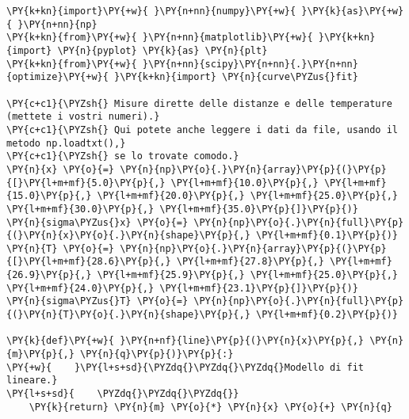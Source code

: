 \begin{Verbatim}[label=\makebox{\href{https://github.com/unipi-physics-labs/lab1-sheets/tree/main/snippy/conducibilita_termica.py}{https://github.com/.../conducibilita\_termica.py}},commandchars=\\\{\}]
\PY{k+kn}{import}\PY{+w}{ }\PY{n+nn}{numpy}\PY{+w}{ }\PY{k}{as}\PY{+w}{ }\PY{n+nn}{np}
\PY{k+kn}{from}\PY{+w}{ }\PY{n+nn}{matplotlib}\PY{+w}{ }\PY{k+kn}{import} \PY{n}{pyplot} \PY{k}{as} \PY{n}{plt}
\PY{k+kn}{from}\PY{+w}{ }\PY{n+nn}{scipy}\PY{n+nn}{.}\PY{n+nn}{optimize}\PY{+w}{ }\PY{k+kn}{import} \PY{n}{curve\PYZus{}fit}

\PY{c+c1}{\PYZsh{} Misure dirette delle distanze e delle temperature (mettete i vostri numeri).}
\PY{c+c1}{\PYZsh{} Qui potete anche leggere i dati da file, usando il metodo np.loadtxt(),}
\PY{c+c1}{\PYZsh{} se lo trovate comodo.}
\PY{n}{x} \PY{o}{=} \PY{n}{np}\PY{o}{.}\PY{n}{array}\PY{p}{(}\PY{p}{[}\PY{l+m+mf}{5.0}\PY{p}{,} \PY{l+m+mf}{10.0}\PY{p}{,} \PY{l+m+mf}{15.0}\PY{p}{,} \PY{l+m+mf}{20.0}\PY{p}{,} \PY{l+m+mf}{25.0}\PY{p}{,} \PY{l+m+mf}{30.0}\PY{p}{,} \PY{l+m+mf}{35.0}\PY{p}{]}\PY{p}{)}
\PY{n}{sigma\PYZus{}x} \PY{o}{=} \PY{n}{np}\PY{o}{.}\PY{n}{full}\PY{p}{(}\PY{n}{x}\PY{o}{.}\PY{n}{shape}\PY{p}{,} \PY{l+m+mf}{0.1}\PY{p}{)}
\PY{n}{T} \PY{o}{=} \PY{n}{np}\PY{o}{.}\PY{n}{array}\PY{p}{(}\PY{p}{[}\PY{l+m+mf}{28.6}\PY{p}{,} \PY{l+m+mf}{27.8}\PY{p}{,} \PY{l+m+mf}{26.9}\PY{p}{,} \PY{l+m+mf}{25.9}\PY{p}{,} \PY{l+m+mf}{25.0}\PY{p}{,} \PY{l+m+mf}{24.0}\PY{p}{,} \PY{l+m+mf}{23.1}\PY{p}{]}\PY{p}{)}
\PY{n}{sigma\PYZus{}T} \PY{o}{=} \PY{n}{np}\PY{o}{.}\PY{n}{full}\PY{p}{(}\PY{n}{T}\PY{o}{.}\PY{n}{shape}\PY{p}{,} \PY{l+m+mf}{0.2}\PY{p}{)}

\PY{k}{def}\PY{+w}{ }\PY{n+nf}{line}\PY{p}{(}\PY{n}{x}\PY{p}{,} \PY{n}{m}\PY{p}{,} \PY{n}{q}\PY{p}{)}\PY{p}{:}
\PY{+w}{    }\PY{l+s+sd}{\PYZdq{}\PYZdq{}\PYZdq{}Modello di fit lineare.}
\PY{l+s+sd}{    \PYZdq{}\PYZdq{}\PYZdq{}}
    \PY{k}{return} \PY{n}{m} \PY{o}{*} \PY{n}{x} \PY{o}{+} \PY{n}{q}


\end{Verbatim}
